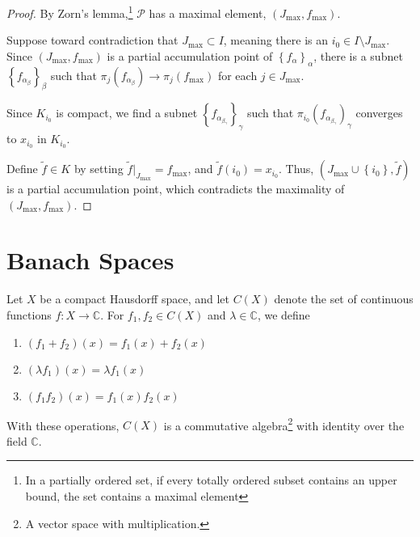 \documentclass[10pt]{extarticle}
\newcommand{\C}{\mathbb{C}}
\newcommand{\set}[1]{\left\{#1\right\}}
\theoremstyle{plain}
\theoremstyle{definition}
\theoremstyle{note}
\renewcommand{\newline}{\hfill\break}
\begin{document}
\begin{proof}
  By Zorn's lemma,\footnote{In a partially ordered set, if every totally ordered subset contains an upper bound, the set contains a maximal element} $\mathcal{P}$ has a maximal element, $\left(J_{\text{max}},f_{\text{max}}\right)$.\newline

  Suppose toward contradiction that $J_{\text{max}}\subset I$, meaning there is an $i_0\in I\setminus J_{\text{max}}$. Since $\left(J_{\text{max}},f_{\text{max}}\right)$ is a partial accumulation point of $\set{f_{\alpha}}_{\alpha}$, there is a subnet $\set{f_{\alpha_\beta}}_{\beta}$ such that $\pi_{j}\left(f_{\alpha_\beta}\right) \rightarrow \pi_{j}\left(f_{\text{max}}\right)$ for each $j\in J_{\text{max}}$.\newline

  Since $K_{i_0}$ is compact, we find a subnet $\set{f_{\alpha_{\beta_{\gamma}}}}_{\gamma}$ such that $\pi_{i_0}\left(f_{\alpha_{\beta_{\gamma}}}\right)_{\gamma}$ converges to $x_{i_0}$ in $K_{i_0}$.\newline

  Define $\tilde{f} \in K$ by setting $\tilde{f}\vert_{J_{\text{max}}} = f_{\text{max}}$, and $\tilde{f}(i_0) = x_{i_0}$. Thus, $\left(J_{\text{max}}\cup \set{i_0},\tilde{f}\right)$ is a partial accumulation point, which contradicts the maximality of $\left(J_{\text{max}},f_{\text{max}}\right)$.
\end{proof}
\section{Banach Spaces}%
Let $X$ be a compact Hausdorff space, and let $C(X)$ denote the set of continuous functions $f: X\rightarrow \C$. For $f_1,f_2\in C(X)$ and $\lambda\in \C$, we define
\begin{enumerate}[(1)]
  \item $\displaystyle \left(f_1 + f_2\right)(x) = f_1(x) + f_2(x)$
  \item $\displaystyle \left(\lambda f_1\right)(x) = \lambda f_1(x)$
  \item $\displaystyle \left(f_1f_2\right)(x) = f_1(x)f_2(x)$
\end{enumerate}
With these operations, $C(X)$ is a commutative algebra\footnote{A vector space with multiplication.} with identity over the field $\C$.\newline
\end{document}

